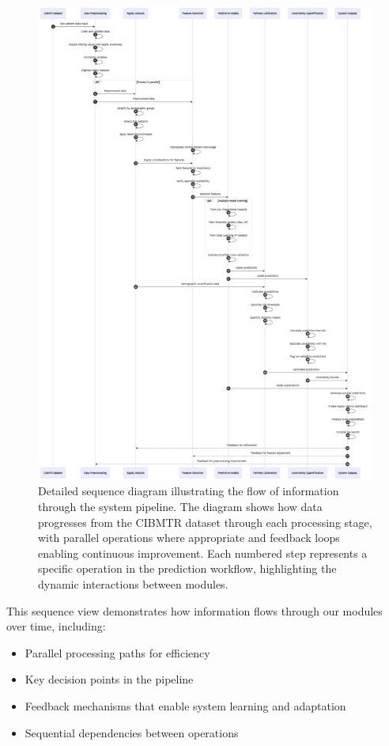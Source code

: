 \begin{figure}[H]
    \centering
    \includegraphics[width=1\textwidth]{figures/SystemSequenceDiagram.png}
    \caption{Detailed sequence diagram illustrating the flow of information through the system pipeline. The diagram shows how data progresses from the CIBMTR dataset through each processing stage, with parallel operations where appropriate and feedback loops enabling continuous improvement. Each numbered step represents a specific operation in the prediction workflow, highlighting the dynamic interactions between modules.}
    \label{fig:system_sequence_diagram}
\end{figure}

This sequence view demonstrates how information flows through our modules over time, including:
\begin{itemize}
    \item Parallel processing paths for efficiency
    \item Key decision points in the pipeline
    \item Feedback mechanisms that enable system learning and adaptation
    \item Sequential dependencies between operations
\end{itemize}

